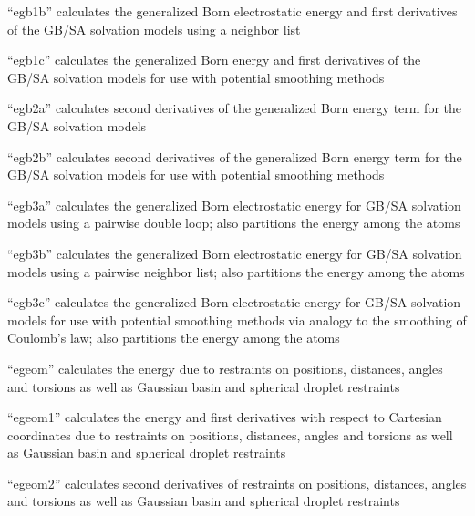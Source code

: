 \documentclass[letterpaper,11pt,english]{sphinxmanual}
\begin{document}

“egb1b” calculates the generalized Born electrostatic energy
and first derivatives of the GB/SA solvation models using a
neighbor list


“egb1c” calculates the generalized Born energy and first
derivatives of the GB/SA solvation models for use with
potential smoothing methods


“egb2a” calculates second derivatives of the generalized
Born energy term for the GB/SA solvation models


“egb2b” calculates second derivatives of the generalized
Born energy term for the GB/SA solvation models for use with
potential smoothing methods


“egb3a” calculates the generalized Born electrostatic energy
for GB/SA solvation models using a pairwise double loop; also
partitions the energy among the atoms


“egb3b” calculates the generalized Born electrostatic energy
for GB/SA solvation models using a pairwise neighbor list; also
partitions the energy among the atoms


“egb3c” calculates the generalized Born electrostatic energy
for GB/SA solvation models for use with potential smoothing
methods via analogy to the smoothing of Coulomb’s law; also
partitions the energy among the atoms


“egeom” calculates the energy due to restraints on positions,
distances, angles and torsions as well as Gaussian basin and
spherical droplet restraints


“egeom1” calculates the energy and first derivatives
with respect to Cartesian coordinates due to restraints
on positions, distances, angles and torsions as well as
Gaussian basin and spherical droplet restraints


“egeom2” calculates second derivatives of restraints
on positions, distances, angles and torsions as well
as Gaussian basin and spherical droplet restraints
\end{document}
